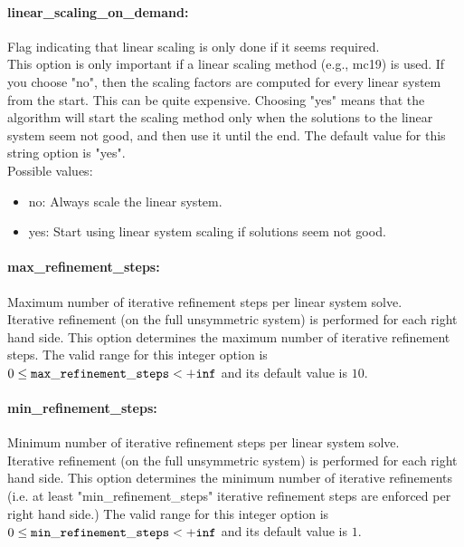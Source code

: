 \paragraph{linear\_scaling\_on\_demand:}\label{opt:linear_scaling_on_demand} Flag indicating that linear scaling is only done if it seems required. \\
 This option is only important if a linear scaling
method (e.g., mc19) is used.  If you choose "no",
then the scaling factors are computed for every
linear system from the start.  This can be quite
expensive. Choosing "yes" means that the
algorithm will start the scaling method only when
the solutions to the linear system seem not good,
and then use it until the end. The default value for this string option is "yes".
\\ 
Possible values:
\begin{itemize}
   \item no: Always scale the linear system.
   \item yes: Start using linear system scaling if solutions
seem not good.
\end{itemize}

\paragraph{max\_refinement\_steps:}\label{opt:max_refinement_steps} Maximum number of iterative refinement steps per linear system solve. \\
 Iterative refinement (on the full unsymmetric
system) is performed for each right hand side. 
This option determines the maximum number of
iterative refinement steps. The valid range for this integer option is
$0 \le {\tt max\_refinement\_steps } <  {\tt +inf}$
and its default value is $10$.


\paragraph{min\_refinement\_steps:}\label{opt:min_refinement_steps} Minimum number of iterative refinement steps per linear system solve. \\
 Iterative refinement (on the full unsymmetric
system) is performed for each right hand side. 
This option determines the minimum number of
iterative refinements (i.e. at least
"min\_refinement\_steps" iterative refinement
steps are enforced per right hand side.) The valid range for this integer option is
$0 \le {\tt min\_refinement\_steps } <  {\tt +inf}$
and its default value is $1$.


